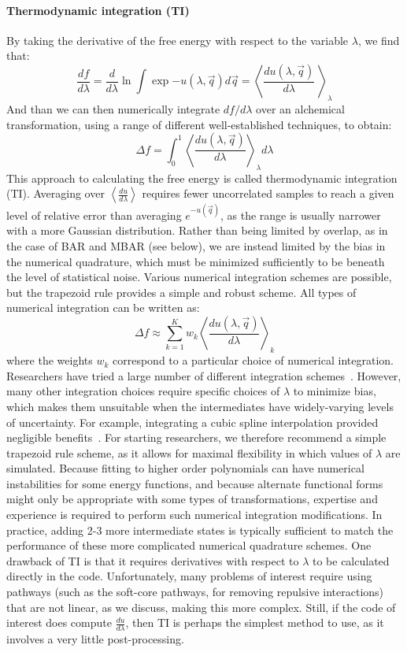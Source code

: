 \documentclass[9pt,bestpractices]{livecoms}
\newcommand{\expect}[1]{\left\langle{#1}\right\rangle}
\begin{document}
\paragraph{Thermodynamic integration (TI)}
By taking the derivative of the free energy with respect to the
variable $\lambda$, we find that:
\begin{equation}
\frac{df}{d\lambda} = \frac{d}{d\lambda} \ln \int \exp{-u(\lambda,\vec{q})} d\vec{q} = \expect{\frac{du(\lambda,\vec{q})}{d\lambda}\
}_{\lambda} 
\end{equation}
And than we can then numerically integrate $df/d\lambda$ over an alchemical transformation, using a range of different well-established techniques, to obtain:
\begin{equation}
\Delta f    = \int_{0}^{1} \expect{\frac{du(\lambda,\vec{q})}{d\lambda}}_{\lambda}  d\lambda    
\end{equation}
This approach to calculating the free energy is called thermodynamic integration (TI). Averaging over $\expect{\frac{du}{d\lambda}}$ requires fewer uncorrelated samples to reach a given level of relative error
than averaging $e^{-u(\vec{q})}$, as the range is usually narrower with a more Gaussian distribution. Rather than being limited by overlap, as in the case of BAR and MBAR (see below), we are instead limited by the bias in the numerical quadrature, which must be minimized sufficiently to be beneath the level of statistical noise.
%
Various numerical integration schemes are possible, but the trapezoid
rule provides a simple and robust scheme.  All types of numerical integration can be written as:
\[ \Delta f \approx \sum_{k=1}^{K} w_k
\expect{\frac{du(\lambda,\vec{q})}{d\lambda}}_{k} \] where the weights $w_k$ correspond to a particular choice of numerical integration.
Researchers have tried a large number of different integration schemes~\cite{resat1993studies,jorge2010effect,shyu2009reducing}. However, many other integration choices require specific choices of $\lambda$ to minimize bias, which makes them unsuitable when the intermediates
have widely-varying levels of uncertainty. For example, integrating a cubic spline interpolation provided negligible benefits~\cite{paliwal2011benchmark}. For starting researchers, we therefore recommend a simple trapezoid rule scheme, as it allows for maximal flexibility in which values of $\lambda$ are simulated.  Because fitting to higher order polynomials can have numerical instabilities for some energy functions, and because alternate functional forms might only be appropriate with some types of transformations, expertise and experience is required to perform such numerical integration modifications. In practice, adding 2-3 more intermediate states is typically sufficient to match the performance of these more complicated numerical quadrature schemes.
%
One drawback of TI is that it requires derivatives with respect to $\lambda$ to be calculated directly in the code. Unfortunately, many problems of interest require using pathways (such as the soft-core pathways, for removing repulsive interactions) that are not linear, as we discuss, making this more complex. Still, if the code of interest does compute $\frac{du}{d\lambda}$, then TI is perhaps the simplest method to use, as it involves a very little post-processing.
%
\end{document}
